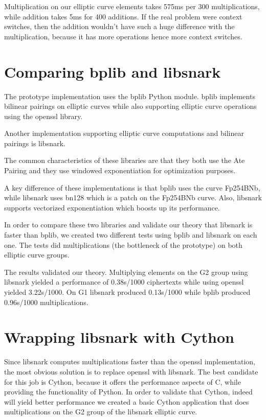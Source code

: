 \documentclass{article}
\begin{document}
Multiplication on our elliptic curve elements takes 575ms per 300
multiplications, while addition takes 5ms for 400 additions. If the real
problem were context switches, then the addition wouldn't have such a huge
difference with the multiplication, because it has more operations hence
more context switches.


\section{Comparing bplib and libsnark}

The prototype implementation uses the bplib\cite{bplib} Python module.
bplib implements bilinear pairings on elliptic curves while also supporting
elliptic curve operations using the openssl library.

Another implementation supporting elliptic curve computations and bilinear
pairings is libsnark\cite{libsnark}.

The common characteristics of these libraries are that they both use the
Ate Pairing and they use windowed exponentiation for
optimization purposes.

A key difference of these implementations is that bplib uses the
curve Fp254BNb, while libsnark uses bn128 which is a patch on the
Fp254BNb curve. Also, libsnark supports vectorized exponentiation
which boosts up its performance.

In order to compare these two libraries and validate our theory that
libsnark is faster than bplib, we created two different tests
using bplib and libsnark on each one. The tests did multiplications
(the bottleneck of the prototype) on both elliptic curve groups.

The results validated our theory. Multiplying elements on the G2
group using libsnark yielded a performance of 0.38s/1000 ciphertexts
while using openssl yielded 3.22s/1000. On G1 libsnark produced
0.13s/1000 while bplib produced 0.96s/1000 multiplications.


\section{Wrapping libsnark with Cython}

Since libsnark computes multiplications faster than the openssl
implementation, the most obvious solution is to replace openssl
with libsnark. The best candidate for this job is Cython, because
it offers the performance aspects of C, while providing the functionality
of Python. In order to validate that Cython, indeed will yield better
performance we created a basic Cython application that does multiplications
on the G2 group of the libsnark elliptic curve.
\end{document}
